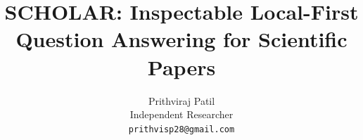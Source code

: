 \documentclass[11pt]{article}
\title{\textsc{SCHOLAR}: Inspectable Local-First Question Answering for Scientific Papers}
\author{Prithviraj Patil \\
  Independent Researcher \\
  \texttt{prithvisp28@gmail.com}
}
\begin{document}
\maketitle

\begin{abstract}

\end{abstract}










\Needspace{0.28\textheight}

\balance
\clearpage




\clearpage
\appendix

\end{document}

